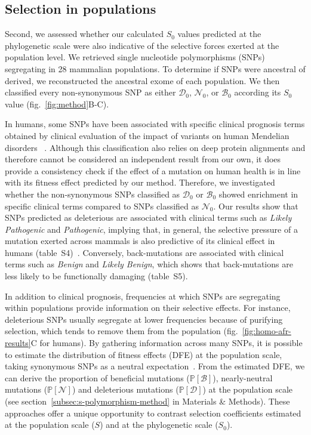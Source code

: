 \documentclass{article}
\newcommand{\proba}{\mathbb{P}}
\newcommand{\Sphy}{S_{0}}
\newcommand{\SphyDel}{\mathcal{D}_0}
\newcommand{\SphyNeu}{\mathcal{N}_0}
\newcommand{\SphyBen}{\mathcal{B}_0}
\newcommand{\Spop}{S}
\newcommand{\SpopDel}{\mathcal{D}}
\newcommand{\SpopNeu}{\mathcal{N}}
\newcommand{\SpopBen}{\mathcal{B}}
\newcommand{\ProbaPopDel}{\proba [ \SpopDel]}
\newcommand{\ProbaPopNeu}{\proba [ \SpopNeu ]}
\newcommand{\ProbaPopBen}{\proba [ \SpopBen ]}
\begin{document}
    \subsection*{Selection in populations}
    Second, we assessed whether our calculated $\Sphy$ values predicted at the phylogenetic scale were also indicative of the selective forces exerted at the population level.
    We retrieved single nucleotide polymorphisms (SNPs) segregating in 28 mammalian populations.
    To determine if SNPs were ancestral of derived, we reconstructed the ancestral exome of each population.
    We then classified every non-synonymous SNP as either $\SphyDel$, $\SphyNeu$, or $\SphyBen$ according its $\Sphy$ value (fig.~\ref{fig:method}B-C).

    In humans, some SNPs have been associated with specific clinical prognosis terms obtained by clinical evaluation of the impact of variants on human Mendelian disorders ~\cite{landrum_clinvar_2018}.
    Although this classification also relies on deep protein alignments and therefore cannot be considered an independent result from our own, it does provide a consistency check if the effect of a mutation on human health is in line with its fitness effect predicted by our method.
    Therefore, we investigated whether the non-synonymous SNPs classified as $\SphyDel$ or $\SphyBen$ showed enrichment in specific clinical terms compared to SNPs classified as $\SphyNeu$.
    Our results show that SNPs predicted as deleterious are associated with clinical terms such as \textit{Likely Pathogenic} and \textit{Pathogenic}, implying that, in general, the selective pressure of a mutation exerted across mammals is also predictive of its clinical effect in humans (table~S4)~\cite{sullivan_leveraging_2023}.
    Conversely, back-mutations are associated with clinical terms such as \textit{Benign} and \textit{Likely Benign}, which shows that back-mutations are less likely to be functionally damaging (table~S5).

    In addition to clinical prognosis, frequencies at which SNPs are segregating within populations provide information on their selective effects.
    For instance, deleterious SNPs usually segregate at lower frequencies because of purifying selection, which tends to remove them from the population (fig.~\ref{fig:homo-afr-results}C for humans).
    By gathering information across many SNPs, it is possible to estimate the distribution of fitness effects (DFE) at the population scale, taking synonymous SNPs as a neutral expectation~\cite{eyre-walker_distribution_2006, eyre-walker_estimating_2009, galtier_adaptive_2016, tataru_inference_2017}.
    From the estimated DFE, we can derive the proportion of beneficial mutations ($\ProbaPopBen$), nearly-neutral mutations ($\ProbaPopNeu$) and deleterious mutations ($\ProbaPopDel$) at the population scale (see section~\ref{subsec:s-polymorphism-method} in Materials \& Methods).
    These approaches offer a unique opportunity to contrast selection coefficients estimated at the population scale ($\Spop$) and at the phylogenetic scale ($\Sphy$).
\end{document}
